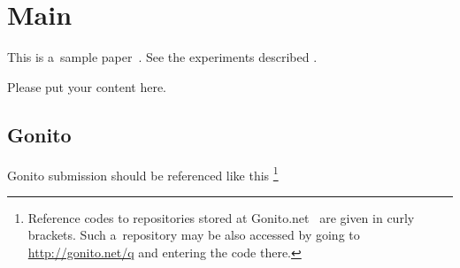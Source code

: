 
\section{Main}

This is a~sample paper~\cite{DBLP:journals/corr/cs-CL-0108005}.
See the experiments described .

Please put your content here.



\subsection{Gonito}

Gonito submission should be referenced like this
%
\footnote{Reference codes to repositories stored at
Gonito.net~\cite{gonito2016} are given in curly brackets. Such a~repository may be also accessed by going
to \url{http://gonito.net/q} and entering the code there.}
